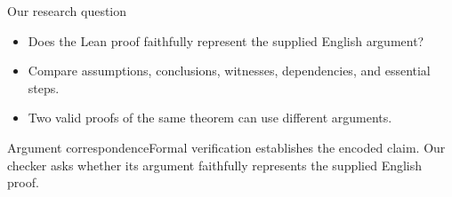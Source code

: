 \documentclass[aspectratio=169,11pt]{beamer}
\begin{document}
\begin{frame}{Our research question}
\begin{itemize}
\item Does the Lean proof faithfully represent the supplied English argument?
\item Compare assumptions, conclusions, witnesses, dependencies, and essential steps.
\item Two valid proofs of the same theorem can use different arguments.
\end{itemize}
\begin{block}{Argument correspondence}Formal verification establishes the encoded claim. Our checker asks whether its argument faithfully represents the supplied English proof.\end{block}
\end{frame}
\end{document}

